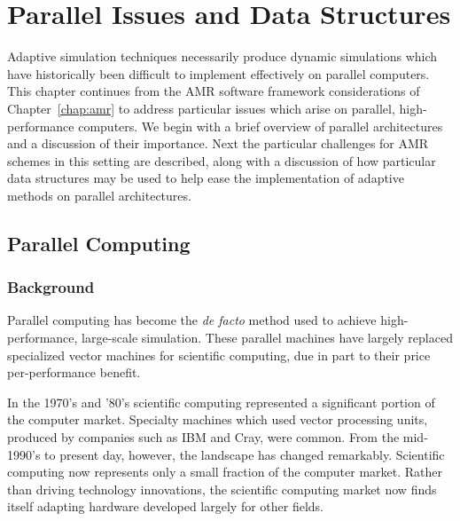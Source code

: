 \chapter{Parallel Issues and Data Structures\label{chap:parallel}}

Adaptive simulation techniques necessarily produce dynamic simulations which have historically been difficult to implement effectively on parallel computers. This chapter continues from the AMR software framework considerations of Chapter~\ref{chap:amr} to address particular issues which arise on parallel, high-performance computers.  We begin with a brief overview of parallel architectures and a discussion of their importance.  Next the particular challenges for AMR schemes in this setting are described, along with a discussion of how particular data structures may be used to help ease the implementation of adaptive methods on parallel architectures.

\section{Parallel Computing}
\subsection{Background}
Parallel computing has become the \emph{de facto} method used to achieve high-performance, large-scale simulation. These parallel machines have largely replaced specialized vector machines for scientific computing, due in part to their price per-performance benefit.  %

In the 1970's and '80's scientific computing represented a significant portion of the computer market.  Specialty machines which used vector processing units, produced by companies such as IBM and Cray, were common.  From the mid-1990's to present day, however, the landscape has changed remarkably.  Scientific computing now represents only a small fraction of the computer market.  Rather than driving technology innovations, the scientific computing market now finds itself adapting hardware developed largely for other fields.

